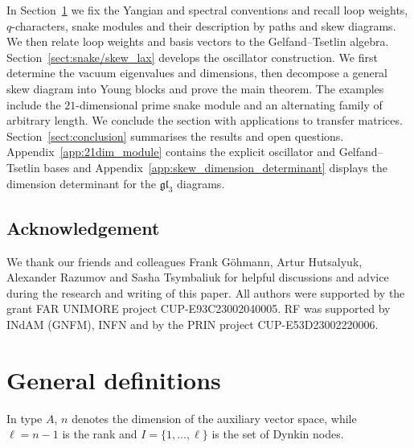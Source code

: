 \documentclass[12pt,reqno]{amsart}
\numberwithin{equation}{section}
\begin{document}
In Section~\ref{sect:gen_def} we fix the Yangian and spectral
conventions and recall loop weights, $q$-characters, snake modules
and their description by paths and skew diagrams. We then relate
loop weights and basis vectors to the Gelfand--Tsetlin algebra.
%
Section~\ref{sect:snake/skew_lax} develops the oscillator construction.
We first determine the vacuum eigenvalues and dimensions, then
decompose a general skew diagram into Young blocks and prove the
main theorem. The examples include the $21$-dimensional prime
snake module and an alternating family of arbitrary length.
We conclude the section with applications to transfer matrices.
Section~\ref{sect:conclusion} summarises the results and open questions.
%
Appendix~\ref{app:21dim_module} contains the explicit oscillator and
Gelfand--Tsetlin bases and Appendix~\ref{app:skew_dimension_determinant}
displays the dimension determinant for the $\mathfrak{gl}_3$ diagrams.

	\subsection*{Acknowledgement}

	We thank our friends and colleagues Frank Göhmann, Artur Hutsalyuk, Alexander Razumov and Sasha Tsymbaliuk for helpful discussions and advice during the research and writing of this paper.
%
	All authors were supported by the grant FAR UNIMORE project CUP-E93C23002040005. RF was supported by INdAM (GNFM), INFN and by the PRIN project CUP-E53D23002220006.



	\section{General definitions}
	\label{sect:gen_def}
    In type $A$, $n$ denotes the dimension of the auxiliary vector space,
    while $\ell=n-1$ is the rank and $I=\{1,\ldots,\ell\}$ is the set of
    Dynkin nodes.
\end{document}
